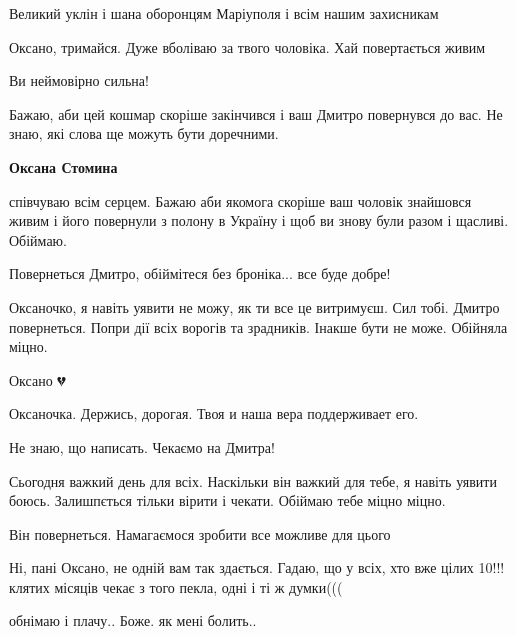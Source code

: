 
Великий уклін і шана оборонцям Маріуполя і всім нашим захисникам


Оксано, тримайся. Дуже вболіваю за твого чоловіка. Хай повертається живим


Ви неймовірно сильна!

Бажаю, аби цей кошмар скоріше закінчився і ваш Дмитро повернувся до вас. Не
знаю, які слова ще можуть бути доречними.

\textbf{Оксана Стомина} 

співчуваю всім серцем. Бажаю аби якомога скоріше ваш чоловік знайшовся живим і
його повернули з полону в Україну і щоб ви знову були разом і щасливі. Обіймаю.


Повернеться Дмитро, обіймітеся без броніка... все буде добре!


Оксаночко, я навіть уявити не можу, як ти все це витримуєш. Сил тобі. Дмитро
повернеться. Попри дії всіх ворогів та зрадників. Інакше бути не може. Обійняла
міцно.


Оксано 💔


Оксаночка. Держись, дорогая. Твоя и наша вера поддерживает его.


Не знаю, що написать. Чекаємо на Дмитра!


Сьогодня важкий день для всіх. Наскільки він важкий для тебе, я навіть уявити
боюсь. Залишпється тільки вірити і чекати. Обіймаю тебе міцно міцно. 💙💙💙


Він повернеться. Намагаємося зробити все можливе для цього💙💛


Ні, пані Оксано, не одній вам так здається. Гадаю, що у всіх, хто вже цілих
10!!! клятих місяців чекає з того пекла, одні і ті ж думки(((


обнімаю і плачу.. Боже. як мені болить..


